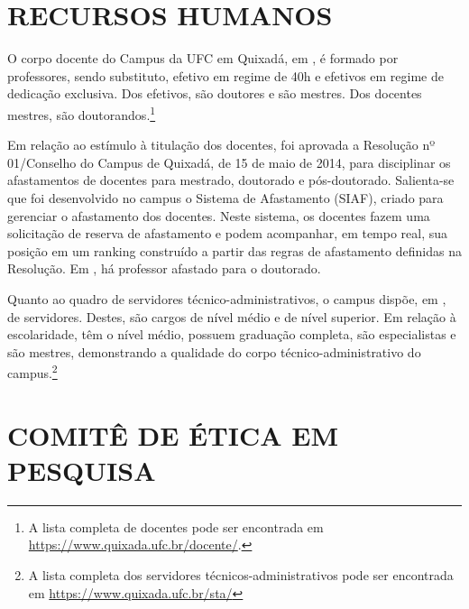 \section{RECURSOS HUMANOS}

\def\ufc{\xspace}
\def\ufc{\xspace}

O corpo docente do Campus da UFC em Quixadá, em \ufcAnoReferencia, é formado por \ufcNumDocentes professores, sendo \ufcNumDocSubstitutos substituto, \ufcNumDocQuarentaHoras efetivo em regime de 40h e \ufcNumDocDE efetivos em regime de dedicação exclusiva. Dos efetivos, \ufcDocDoutores são doutores e \ufcDocMestres são mestres. Dos \ufcDocMestres docentes mestres, \ufcDocDoutorandos são doutorandos.\footnote{A lista completa de docentes pode ser encontrada em \url{https://www.quixada.ufc.br/docente/}.}

Em relação ao estímulo à titulação dos docentes, foi aprovada a Resolução nº 01/Conselho do Campus de Quixadá, de 15 de maio de 2014, para disciplinar os afastamentos de docentes para mestrado, doutorado e pós-doutorado. Salienta-se que foi desenvolvido no campus o Sistema de Afastamento (SIAF), criado para gerenciar o afastamento dos docentes. Neste sistema, os docentes fazem uma solicitação de reserva de afastamento e podem acompanhar, em tempo real, sua posição em um ranking construído a partir das regras de afastamento definidas na Resolução. Em \ufcAnoReferencia, há \ufcDocAfasDoutorado professor afastado para o doutorado.

Quanto ao quadro de servidores técnico-administrativos, o campus dispõe, em \ufcAnoReferencia, de \ufcNumSTA servidores. Destes, \ufcNumSTAMedio são cargos de nível médio e \ufcNumSTASuperior de nível superior. Em relação à escolaridade, \ufcSTAEscMedio têm o nível médio, \ufcSTAEscGrad possuem graduação completa, \ufcSTAEscEspec são especialistas e \ufcSTAEscMestre são mestres, demonstrando a qualidade do corpo técnico-administrativo do campus.\footnote{A lista completa dos servidores técnicos-administrativos pode ser encontrada em \url{https://www.quixada.ufc.br/sta/}}

\section{COMITÊ DE ÉTICA EM PESQUISA}

